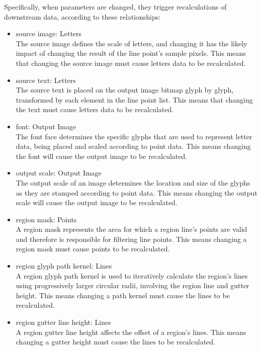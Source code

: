 Specifically, when parameters are changed, they trigger recalculations of downstream data, according to these relationships:
\begin{itemize}
  \item source image: Letters \\
        The source image defines the scale of letters, and changing it has the likely impact of changing the result of the line point's sample pixels.
        This means that changing the source image must cause letters data to be recalculated.

  \item source text: Letters \\
        The source text is placed on the output image bitmap glyph by glyph, transformed by each element in the line point list.
        This means that changing the text must cause letters data to be recalculated.

  \item font: Output Image \\
        The font face determines the specific glyphs that are used to represent letter data, being placed and scaled according to point data.
        This means changing the font will cause the output image to be recalculated.

  \item output scale: Output Image \\
        The output scale of an image determines the location and size of the glyphs as they are stamped according to point data.
        This means changing the output scale will cause the output image to be recalculated.

  \item region mask: Points \\
        A region mask represents the area for which a region line's points are valid and therefore is responsible for filtering line points.
        This means changing a region mask must cause points to be recalculated.

  \item region glyph path kernel: Lines \\
        A region glyph path kernel is used to iteratively calculate the region's lines using progressively larger circular radii, involving the region line and gutter height.
        This means changing a path kernel must cause the lines to be recalculated.

  \item region gutter line height: Lines \\
        A region gutter line height affects the offset of a region's lines.
        This means changing a gutter height must cause the lines to be recalculated.


\end{itemize}
